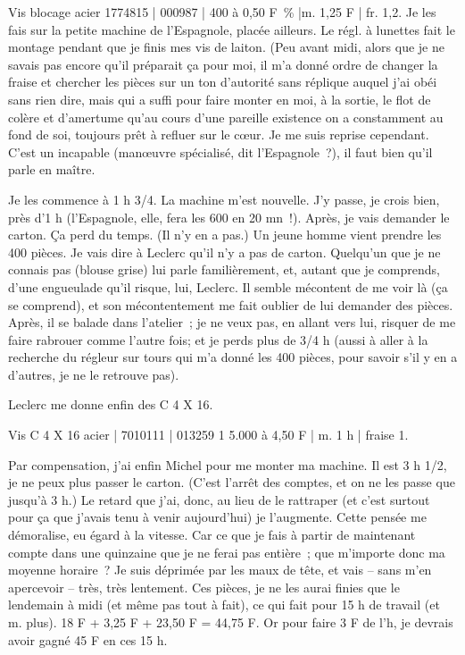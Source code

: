 \documentclass[french,twoside]{book} %
\begin{document}
Vis blocage acier 1774815 | 000987 | 400 à 0,50 F \% |m. 1,25 F | fr. 1,2. Je les fais sur la petite machine de l'Espagnole, placée ailleurs. Le régl. à lunettes fait le montage pendant que je finis mes vis de laiton. (Peu avant midi, alors que je ne savais pas encore qu'il préparait ça pour moi, il m'a donné ordre de changer la fraise et chercher les pièces sur un ton d'autorité sans réplique auquel j'ai obéi sans rien dire, mais qui a suffi pour faire monter en moi, à la sortie, le flot de colère et d'amertume qu'au cours d'une pareille existence on a constamment au fond de soi, toujours prêt à refluer sur le cœur. Je me suis reprise cependant. C'est un incapable (manœuvre spécialisé, dit l'Espagnole ?), il faut bien qu'il parle en maître.\par
Je les commence à 1 h 3/4. La machine m'est nouvelle. J'y passe, je crois bien, près d'1 h (l'Espagnole, elle, fera les 600 en 20 mn !). Après, je vais demander le carton. Ça perd du temps. (Il n'y en a pas.) Un jeune homme vient prendre les 400 pièces. Je vais dire à Leclerc qu'il n'y a pas de carton. Quelqu'un que je ne connais pas (blouse grise) lui parle familièrement, et, autant que je comprends, d'une engueulade qu'il risque, lui, Leclerc. Il semble mécontent de me voir là (ça se comprend), et son mécontentement me fait oublier de lui demander des pièces. Après, il se balade dans l'atelier ; je ne veux pas, en allant vers lui, risquer de me faire rabrouer comme l'autre fois; et je perds plus de 3/4 h (aussi à aller à la recherche du régleur sur tours qui m'a donné les 400 pièces, pour savoir s'il y en a d'autres, je ne le retrouve pas).\par
Leclerc me donne enfin des C 4 X 16.\par
Vis C 4 X 16 acier | 7010111 | 013259 1 5.000 à 4,50 F | m. 1 h | fraise 1.\par
Par compensation, j'ai enfin Michel pour me monter ma machine. Il est 3 h 1/2, je ne peux plus passer le carton. (C'est l'arrêt des comptes, et on ne les passe que jusqu'à 3 h.) Le retard que j'ai, donc, au lieu de le rattraper (et c'est surtout pour ça que j'avais tenu à venir aujourd'hui) je l'augmente. Cette pensée me démoralise, eu égard à la vitesse. Car ce que je fais à partir de maintenant compte dans une quinzaine que je ne ferai pas entière ; que m'importe donc ma moyenne horaire ? Je suis déprimée par les maux de tête, et vais – sans m'en apercevoir – très, très lentement. Ces pièces, je ne les aurai finies que le lendemain à midi (et même pas tout à fait), ce qui fait pour 15 h de travail (et m. plus). 18 F + 3,25 F + 23,50 F = 44,75 F. Or pour faire 3 F de l'h, je devrais avoir gagné 45 F en ces 15 h.\par
\end{document}
